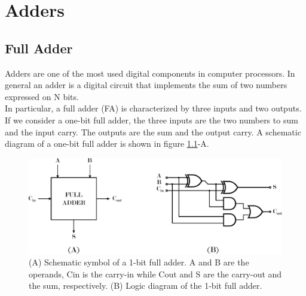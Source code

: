 %
\chapter{Adders}
\label{chap3}



\section{Full Adder}

Adders are one of the most used digital components in computer processors. In general an adder is a digital circuit that implements the sum of two numbers expressed on N bits.\\
In particular, a full adder (FA) is characterized by three inputs and two outputs. If we consider a one-bit full adder, the three inputs are the two numbers to sum and the input carry. The outputs are the sum and the output carry. A schematic diagram of a one-bit full adder is shown in figure \ref{fig:fa}-A. %


	\begin{figure}[ht]
	\centering
	\includegraphics[width=\textwidth]{chapters/figures/fa} 
	\caption{(A) Schematic symbol of a 1-bit full adder. A and B are the operands, Cin is the carry-in while Cout and S are the carry-out and the sum, respectively. (B) Logic diagram of the 1-bit full adder.}
	\label{fig:fa}  %
	\end{figure}

